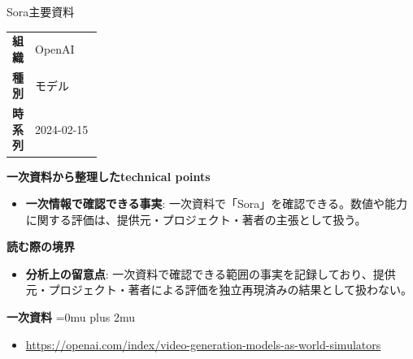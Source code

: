 \begin{technicalnote}{Sora}{主要資料}
\begingroup
\begin{tabularx}{\linewidth}{@{}>{\bfseries}p{0.22\linewidth}X@{}}
組織 & OpenAI \\
種別 & モデル \\
時系列 & 2024-02-15 \\
\end{tabularx}
\smallskip
{\bfseries 一次資料から整理したtechnical points}
\begin{itemize}[leftmargin=1.5em,itemsep=0.35em]
\item \textbf{一次情報で確認できる事実}: 一次資料で「Sora」を確認できる。数値や能力に関する評価は、提供元・プロジェクト・著者の主張として扱う。
\end{itemize}
\begin{minipage}{\linewidth}
{\bfseries 読む際の境界}
\begin{itemize}[leftmargin=1.5em,itemsep=0.35em]
\item \textbf{分析上の留意点}: 一次資料で確認できる範囲の事実を記録しており、提供元・プロジェクト・著者による評価を独立再現済みの結果として扱わない。
\end{itemize}
\begin{samepage}
{\bfseries 一次資料}
\begingroup\sloppy
\Urlmuskip=0mu plus 2mu\relax
\begin{itemize}[leftmargin=1.5em,itemsep=0.25em]
\item {\scriptsize\url{https://openai.com/index/video-generation-models-as-world-simulators}}
\end{itemize}
\endgroup
\end{samepage}
\end{minipage}
\endgroup
\end{technicalnote}
\medskip

